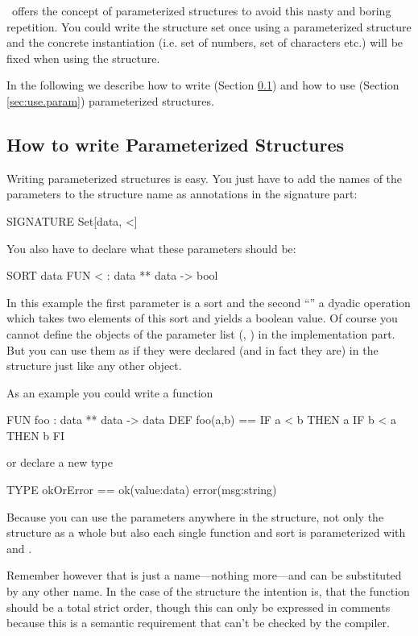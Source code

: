 \opal\ offers the concept of parameterized structures to avoid this
nasty and boring repetition.
You could write the structure set once using a parameterized structure
and the concrete instantiation (i.e. set of numbers, set of characters
etc.) will be fixed when using the structure.

In the following we describe how to write (Section \ref{sec:write.param}) and how to
use (Section \ref{sec:use.param}) parameterized structures.


\subsection{How to write Parameterized Structures}
\label{sec:write.param}
\advanced
 Writing parameterized structures is easy.
You just have to add the names of the parameters to the structure name
as annotations in the signature part:
\begin{prog}
          SIGNATURE Set[data, <]
\end{prog}
You also have to declare what these parameters should be:
\begin{prog}
          SORT data
          FUN < : data ** data -> bool
\end{prog}

In this example the first parameter  is a sort and the second
``\pro{<}'' a dyadic operation which takes two elements of this sort
and yields a boolean value.
Of course you cannot define the objects of the parameter list
(, \pro{<}) in the implementation part.
But you can use them as if they were declared (and in fact they are)
in the structure  just like any other object.

As an example you could write a function
\begin{prog}
          FUN foo : data ** data -> data
          DEF foo(a,b) == IF a < b THEN a
                          IF b < a THEN b FI
\end{prog}
or declare a new type
\begin{prog}
          TYPE okOrError == ok(value:data)
                            error(msg:string)
\end{prog}
Because you can use the parameters anywhere in the structure, not only
the structure as a whole but also each single function and sort is
parameterized with  and \pro{<}.

Remember however that \pro{<} is just a name---nothing more---and can be
substituted by any other name.
In the case of the structure  the  intention is, that the
function should be 
a total strict order, though this can only be expressed in comments
because this is a semantic requirement that can't be checked by the compiler.



